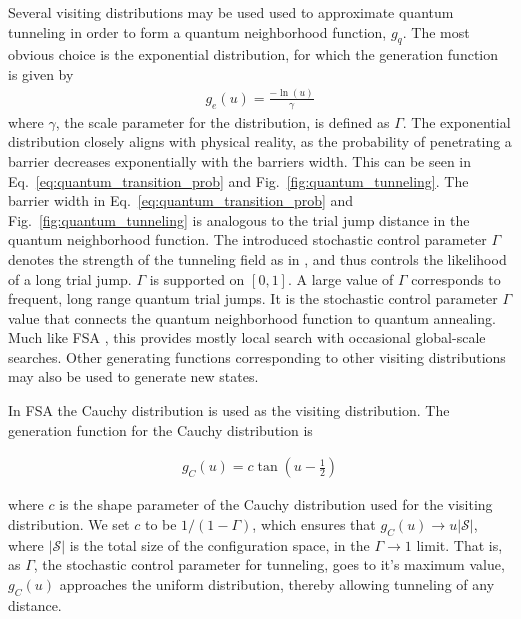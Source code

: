 \documentclass[11pt]{afthesis}
\begin{document}
	Several visiting distributions may be used used to approximate quantum tunneling in order to form a quantum neighborhood function, $g_{q}$. The most obvious choice is the exponential distribution, for which the generation function is given by
	\begin{align}\label{eq:exp_generation_fcn}
	g_{e}(u) =  \frac{-\ln(u)}{\gamma}
	\end{align}
	\noindent where $\gamma$, the scale parameter for the distribution, is defined as $\Gamma$. The exponential distribution closely aligns with physical reality, as the probability of penetrating a barrier decreases exponentially with the barriers width. This can be seen in Eq.~\ref{eq:quantum_transition_prob} and Fig.~\ref{fig:quantum_tunneling}. The barrier width in Eq.~\ref{eq:quantum_transition_prob} and Fig.~\ref{fig:quantum_tunneling} is analogous to the trial jump distance in the quantum neighborhood function. The introduced stochastic control parameter $\Gamma$ denotes the strength of the tunneling field as in \cite{mukherjee2015multivariatesearchqa}, and thus controls the likelihood of a long trial jump. $\Gamma$ is supported on $[0,1]$. A large value of $\Gamma$ corresponds to frequent, long range quantum trial jumps. It is the stochastic control parameter $\Gamma$ value that connects the quantum neighborhood function to quantum annealing. Much like FSA \cite{szu1987fastsimulatedannealing}, this provides mostly local search with occasional global-scale searches. Other generating functions corresponding to other visiting distributions may also be used to generate new states. 
	
	In FSA the Cauchy distribution is used as the visiting distribution. The generation function for the Cauchy distribution is
	
	\begin{align}\label{eq:cauchy_generation_fcn}
	g_{C}(u) =  c \tan\left(u-\frac{1}{2}\right)
	\end{align}
	
	\noindent where $c$ is the shape parameter of the Cauchy distribution used for the visiting distribution. We set $c$ to be $1/(1-\Gamma)$, which ensures that $g_{C}(u) \rightarrow u \left| \boldsymbol{\mathcal{S}}\right| $, where $\left| \boldsymbol{\mathcal{S}}\right|$ is the total size of the configuration space, in the $\Gamma \rightarrow 1$ limit. That is, as $\Gamma$, the stochastic control parameter for tunneling, goes to it's maximum value, $g_{C}(u)$ approaches the uniform distribution, thereby allowing tunneling of any distance.
	
\end{document}
